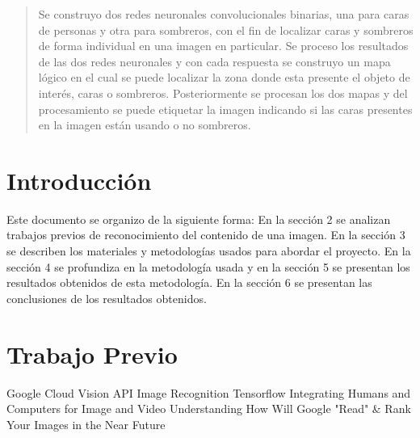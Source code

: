 \documentclass[10pt,twocolumn,letterpaper]{article}
\begin{document}

\begin{abstract}
Se construyo dos redes neuronales convolucionales binarias, una para caras de personas y otra para sombreros, con el fin de localizar caras y sombreros de forma individual en una imagen en particular. Se proceso los resultados de las dos redes neuronales y con cada respuesta se construyo un mapa lógico en el cual se puede localizar la zona donde esta presente el objeto de interés, caras o sombreros. Posteriormente se procesan los dos mapas y del procesamiento se puede etiquetar la imagen indicando si las caras presentes en la imagen están usando o no sombreros.
\end{abstract}

\section{Introducción}
Este documento se organizo de la siguiente forma: En la sección 2 se analizan trabajos previos de reconocimiento del contenido de una imagen. En la sección 3 se describen los materiales y metodologías usados para abordar el proyecto. En la sección 4 se profundiza en la metodología usada y en la sección 5 se presentan los resultados obtenidos de esta metodología. En la sección 6 se presentan las conclusiones de los resultados obtenidos.


\section{Trabajo Previo}

 
Google Cloud Vision API 
Image Recognition Tensorflow
Integrating Humans and Computers for Image and Video Understanding 
How Will Google "Read" \& Rank Your Images in the Near Future













\end{document}
